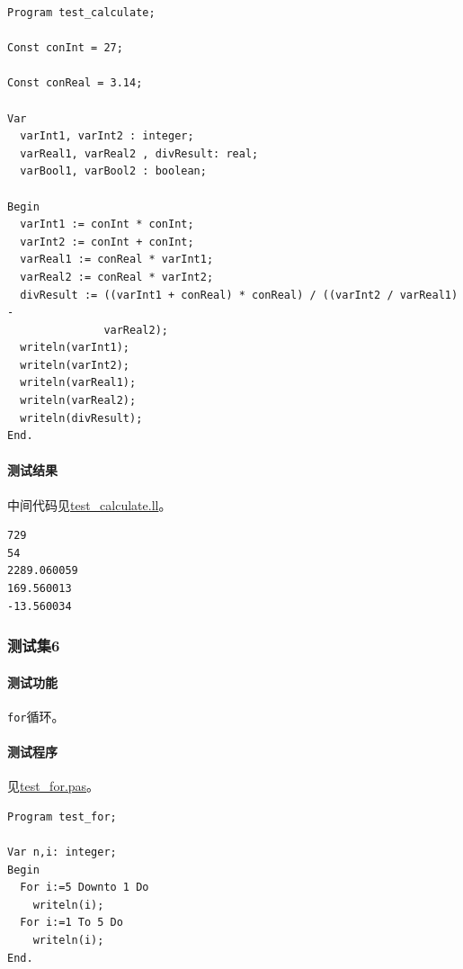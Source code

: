 \documentclass[lang=cn,11pt,a4paper,cite=authornum]{paper}
\begin{document}
\begin{code}
\begin{verbatim}
Program test_calculate;

Const conInt = 27;

Const conReal = 3.14;

Var 
  varInt1, varInt2 : integer;
  varReal1, varReal2 , divResult: real;
  varBool1, varBool2 : boolean;

Begin
  varInt1 := conInt * conInt;
  varInt2 := conInt + conInt;
  varReal1 := conReal * varInt1;
  varReal2 := conReal * varInt2;
  divResult := ((varInt1 + conReal) * conReal) / ((varInt2 / varReal1) -
               varReal2);
  writeln(varInt1);
  writeln(varInt2);
  writeln(varReal1);
  writeln(varReal2);
  writeln(divResult);
End.
\end{verbatim}
\end{code}

\paragraph{测试结果} 中间代码见\href{run:../test/test_calculate.ll}{test\_calculate.ll}。

\begin{code}
\begin{verbatim}
729
54
2289.060059
169.560013
-13.560034
\end{verbatim}
\end{code}

\subsubsection{测试集6}

\paragraph{测试功能} \texttt{for}循环。

\paragraph{测试程序} 见\href{run:../test/test_for.pas}{test\_for.pas}。

\begin{code}
\begin{verbatim}
Program test_for;

Var n,i: integer;
Begin
  For i:=5 Downto 1 Do
    writeln(i);
  For i:=1 To 5 Do
    writeln(i);
End.
\end{verbatim}
\end{code}
\end{document}
